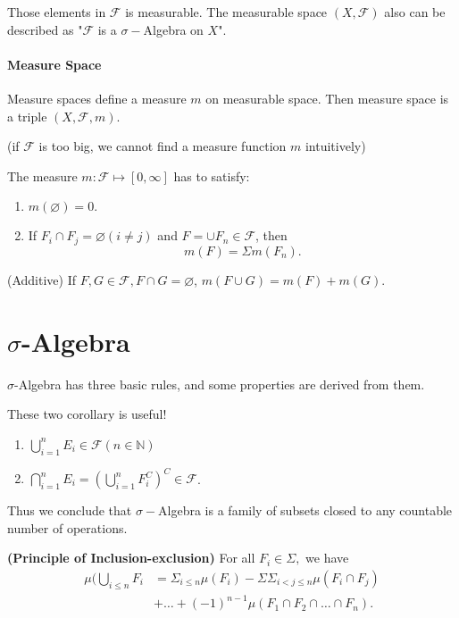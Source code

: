 Those elements in $\mathcal F$ is measurable. The measurable space $(X,\mathcal F)$ also can be described as "$\mathcal F$ is a $\sigma-$Algebra on $X$".

\paragraph{Measure Space} Measure spaces define a measure $m$ on measurable space. Then measure space is a triple $(X,\mathcal F, m)$. 

(if $\mathcal F$ is too big, we cannot find a measure function $m$ intuitively)

The measure $m: \mathcal F\mapsto [0,\infty]$ has to satisfy:
\begin{enumerate}
\item $m(\varnothing) = 0.$
\item If $F_i\cap F_j = \varnothing(i\not= j)$ and $F = \cup F_n \in \mathcal F$, then 
$$m(F) = \Sigma m(F_n).$$  
\end{enumerate}

\begin{corollary}
  (Additive) If $F,G \in \mathcal F,F \cap G = \varnothing$,  $m(F\cup G) = m(F) + m(G)$.
\end{corollary}




\section{$\sigma$-Algebra}
$\sigma$-Algebra has three basic rules, and some properties are derived from them.
\begin{corollary}
  These two corollary is useful!
  \begin{enumerate}
  \item $\bigcup_{i=1}^n E_i\in \mathcal F(n\in \mathbb N)$ 
  \item $\bigcap_{i=1}^n E_i = (\bigcup_{i=1}^n F_i^C)^C \in \mathcal F$.

\end{enumerate}

\end{corollary}

Thus we conclude that $\sigma-$Algebra is a family of subsets closed to any countable number of operations.

\begin{corollary}
  \textbf{(Principle of Inclusion-exclusion)} For all $F_i\in \Sigma,$ we have 
  \begin{equation}
    \nonumber
    \begin{aligned}
      \mu(\bigcup_{i\leq n}F_i & = \Sigma_{i\leq n} \mu(F_i) - \Sigma\Sigma_{i < j\leq n}\mu(F_i\cap F_j) 
    \\ & + \dots +(-1)^{n-1}\mu(F_1\cap F_2\cap\dots \cap F_n).
    \end{aligned}  
  \end{equation}
\end{corollary}

